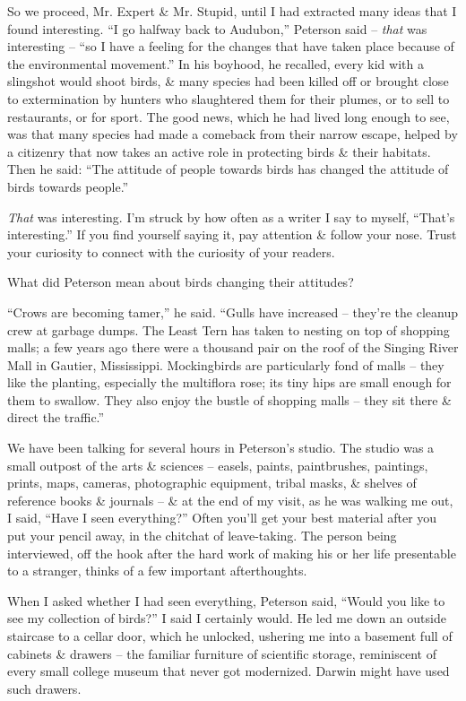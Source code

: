 \documentclass{article}
\numberwithin{equation}{section}
\begin{document}
So we proceed, Mr. Expert \& Mr. Stupid, until I had extracted many ideas that I found interesting. ``I go halfway back to Audubon,'' Peterson said -- \textit{that} was interesting -- ``so I have a feeling for the changes that have taken place because of the environmental movement.'' In his boyhood, he recalled, every kid with a slingshot would shoot birds, \& many species had been killed off or brought close to extermination by hunters who slaughtered them for their plumes, or to sell to restaurants, or for sport. The good news, which he had lived long enough to see, was that many species had made a comeback from their narrow escape, helped by a citizenry that now takes an active role in protecting birds \& their habitats. Then he said: ``The attitude of people towards birds has changed the attitude of birds towards people.''

\textit{That} was interesting. I'm struck by how often as a writer I say to myself, ``That's interesting.'' If you find yourself saying it, pay attention \& follow your nose. Trust your curiosity to connect with the curiosity of your readers.

What did Peterson mean about birds changing their attitudes?

``Crows are becoming tamer,'' he said. ``Gulls have increased -- they're the cleanup crew at garbage dumps. The Least Tern has taken to nesting on top of shopping malls; a few years ago there were a thousand pair on the roof of the Singing River Mall in Gautier, Mississippi. Mockingbirds are particularly fond of malls -- they like the planting, especially the multiflora rose; its tiny hips are small enough for them to swallow. They also enjoy the bustle of shopping malls -- they sit there \& direct the traffic.''

We have been talking for several hours in Peterson's studio. The studio was a small outpost of the arts \& sciences -- easels, paints, paintbrushes, paintings, prints, maps, cameras, photographic equipment, tribal masks, \& shelves of reference books \& journals -- \& at the end of my visit, as he was walking me out, I said, ``Have I seen everything?'' Often you'll get your best material after you put your pencil away, in the chitchat of leave-taking. The person being interviewed, off the hook after the hard work of making his or her life presentable to a stranger, thinks of a few important afterthoughts.

When I asked whether I had seen everything, Peterson said, ``Would you like to see my collection of birds?'' I said I certainly would. He led me down an outside staircase to a cellar door, which he unlocked, ushering me into a basement full of cabinets \& drawers -- the familiar furniture of scientific storage, reminiscent of every small college museum that never got modernized. Darwin might have used such drawers.
\end{document}
